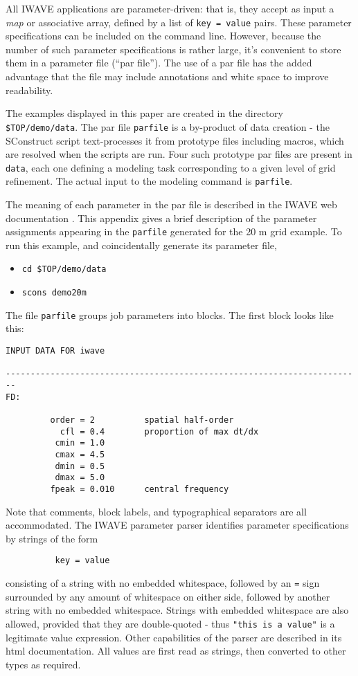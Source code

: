 
All IWAVE applications are parameter-driven: that is, they accept as
input a {\em map} or associative array, defined by 
a list of {\tt key = value} pairs. These parameter specifications can
be included on the command line. However, because the number of such
parameter specifications is rather large, it's convenient to store
them in a parameter file (``par file''). The use of a par file has the
added advantage that the file may include annotations and white space to
improve readability. 

The examples displayed in this paper are created in the directory {\tt
  \$TOP/demo/data}. The par file {\tt parfile} is a by-product of data
creation - the SConstruct script text-processes it from prototype
files including macros, which are resolved when the scripts are
run. Four such prototype par files are present in {\tt data}, each one defining
a modeling task corresponding to a given level of grid refinement. 
The actual input to the modeling command is {\tt parfile}. 

The meaning of each parameter in the par file is described in the IWAVE
web documentation \cite[]{IWAVE}.
This appendix gives a brief description of the parameter assignments
appearing in the {\tt parfile} generated for the 20 m grid example. To
run this example, and coincidentally generate its parameter file,
\begin{itemize}
\item {\tt cd \$TOP/demo/data}
\item {\tt scons demo20m}
\end{itemize}

The file {\tt parfile} groups job parameters into blocks. The first
block looks like this:
\begin{verbatim}
INPUT DATA FOR iwave

------------------------------------------------------------------------
FD:

         order = 2          spatial half-order
           cfl = 0.4        proportion of max dt/dx
          cmin = 1.0
          cmax = 4.5
          dmin = 0.5
          dmax = 5.0
         fpeak = 0.010      central frequency

\end{verbatim}
Note that comments, block labels, and typographical separators are all
accommodated. The IWAVE parameter parser identifies parameter
specifications by strings of the form 
\begin{verbatim}
          key = value
\end{verbatim}
consisting of a string with no embedded whitespace, followed by an
{\tt =} sign surrounded by any amount of whitespace on either side,
followed by another string with no embedded whitespace. Strings with embedded
whitespace are also allowed, provided that they are double-quoted -
thus {\tt "this is a value"} is a legitimate value expression. Other
capabilities of the parser are described in its html
documentation. All values are first read as strings, then
converted to other types as required.


